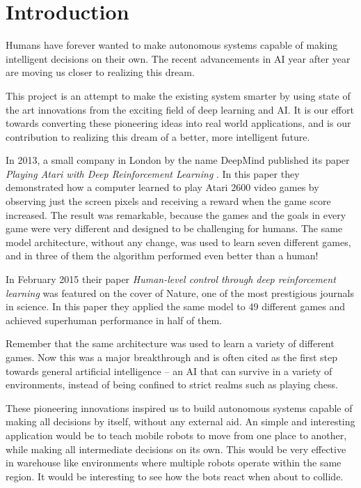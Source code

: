 \documentclass[12pt]{extreport}
\theoremstyle{plain}
\theoremstyle{definition}
\begin{document}
\setcounter{tocdepth}{1}
\tableofcontents

\chapter{Introduction}

Humans have forever wanted to make autonomous systems capable of making intelligent decisions on their own. The recent advancements in AI year after year are moving us closer to realizing this dream.

This project is an attempt to make the existing system smarter by using state of the art innovations from the exciting field of deep learning and AI. It is our effort towards converting these pioneering ideas into real world applications, and is our contribution to realizing this dream of a better, more intelligent future.

In 2013, a small company in London by the name DeepMind published its paper \emph{Playing Atari with Deep Reinforcement Learning} \cite{mnih2013atari}.
In this paper they demonstrated how a computer learned to play Atari 2600 video games by observing just the screen pixels and receiving a reward when the game score increased. The result was remarkable, because the games and the goals in every game were very different and designed to be challenging for humans. The same model architecture, without any change, was used to learn seven different games, and in three of them the algorithm performed even better than a human!

In February 2015 their paper \emph{Human-level control through deep reinforcement learning} \cite{mnih2015nature} was featured on the cover of Nature, one of the most prestigious journals in science. In this paper they applied the same model to 49 different games and achieved superhuman performance in half of them.

Remember that the same architecture was used to learn a variety of different games. Now this was a major breakthrough and is often cited as the first step towards general artificial intelligence – an AI that can survive in a variety of environments, instead of being confined to strict realms such as playing chess.

These pioneering innovations inspired us to build autonomous systems capable of making all decisions by itself, without any external aid. An simple and interesting application would be to teach mobile robots to move from one place to another, while making all intermediate decisions on its own. This would be very effective in warehouse like environments where multiple robots operate within the same region. It would be interesting to see how the bots react when about to collide.
\end{document}
